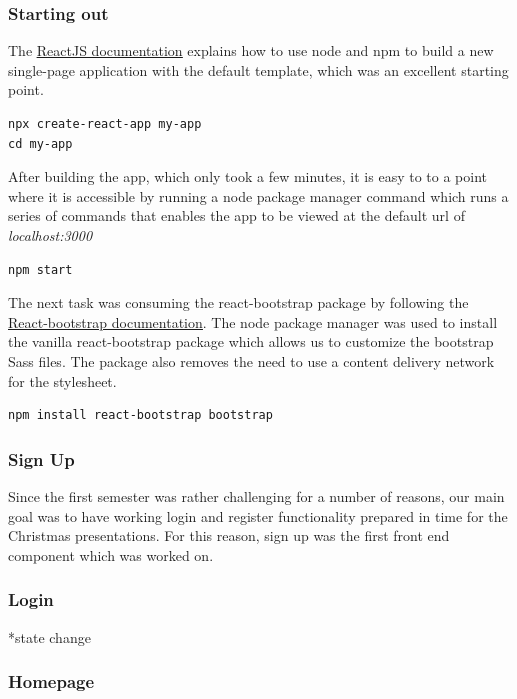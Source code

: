\subsubsection{Starting out}
The \underline{\href{https://react-bootstrap.github.io/getting-started/introduction/}{ReactJS documentation}} explains how to use node and npm to build a new single-page application with the default template, which was an excellent starting point.
\begin{verbatim}
npx create-react-app my-app
cd my-app
\end{verbatim}

After building the app, which only took a few minutes, it is easy to to a point where it is accessible by running a node package manager command which runs a series of commands that enables the app to be viewed at the default url of \emph{localhost:3000}
\begin{verbatim}
npm start
\end{verbatim}

The next task was consuming the react-bootstrap package by following the \underline{\href{https://react-bootstrap.github.io/getting-started/introduction/}{React-bootstrap documentation}}. The node package manager was used to install the vanilla react-bootstrap package which allows us to customize the bootstrap Sass files. The package also removes the need to use a content delivery network for the stylesheet.
\begin{verbatim}
npm install react-bootstrap bootstrap
\end{verbatim}

\subsubsection{Sign Up}
Since the first semester was rather challenging for a number of reasons, our main goal was to have working login and register functionality prepared in time for the Christmas presentations. For this reason, sign up was the first front end component which was worked on. 

\subsubsection{Login}

*state change



\subsubsection{Homepage}


